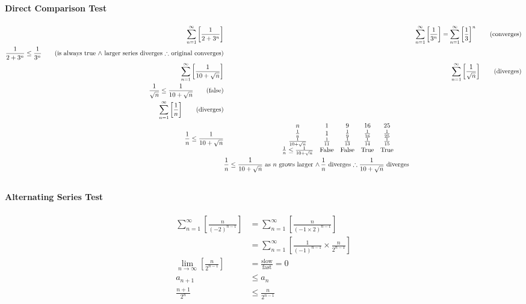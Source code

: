 \documentclass[12pt, A4]{article}
\begin{document}
		\paragraph{Direct Comparison Test}
			\begin{align*}
				\sum_{n = 1}^\infty\left[\frac{1}{2 + 3^n}\right] && \sum_{n = 1}^\infty\left[\frac{1}{3^n}\right] = \sum_{n = 1}^\infty\left[\frac{1}{3}\right]^n \tag{converges} \\ 
				\frac{1}{2 + 3^n} \le \frac{1}{3^n} \tag{is always true \(\land\) larger series diverges \(\therefore\) original converges} \\
				\sum_{n = 1}^\infty\left[\frac{1}{10 + \sqrt{n}}\right] && \sum_{n = 1}^\infty\left[\frac{1}{\sqrt{n}}\right] \tag{diverges} \\
				\frac{1}{\sqrt{n}} \le \frac{1}{10 + \sqrt{n}} \tag{false} \\
				\sum_{n = 1}^\infty\left[\frac{1}{n}\right] \tag{diverges} \\
				\frac{1}{n} \le \frac{1}{10 + \sqrt{n}} &\hspace{3cm}
					\begin{array}{ccccc} n & 1 & 9 & 16 & 25 \\ \frac{1}{n} & 1 & \frac{1}{9} & \frac{1}{16} & \frac{1}{25}  \\ \frac{1}{10 + \sqrt{n}} & \frac{1}{11} & \frac{1}{13} & \frac{1}{14} & \frac{1}{15} \\ \frac{1}{n} \le \frac{1}{10 + \sqrt{n}} & \rm{False} & \rm{False} & \rm{True} & \rm{True} \end{array} \\
				&\text{\(\frac{1}{n} \le \frac{1}{10 + \sqrt{n}}\) as \(n\) grows larger \(\land\, \frac{1}{n}\) diverges \(\therefore \frac{1}{10 + \sqrt{n}}\) diverges}
			\end{align*}
	\subsection{}
		\paragraph{Alternating Series Test}
			\begin{align*}
				\sum_{n = 1}^\infty\left[\frac{n}{(-2)^{n - 1}}\right] &= \sum_{n = 1}^\infty\left[\frac{n}{(-1 \times 2)^{n - 1}}\right] \\
					&= \sum_{n = 1}^\infty\left[\frac{1}{(-1)^{n - 1}} \times \frac{n}{2^{n - 1}}\right] \\
				\lim_{n\to\infty}\left[\frac{n}{2^{n - 1}}\right] &= \mathrm{\frac{slow}{fast}} = 0 \\
				a_{n + 1} &\le a_n \\ \frac{n + 1}{2^n} &\le \frac{n}{2^{n - 1}} \tag{larger denominator \(\therefore\) true \(\therefore\) converges}
			\end{align*}
\end{document}

